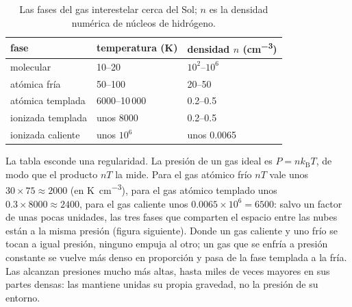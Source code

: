 \begin{table}[htbp]
\centering
\small
\begin{tabular}{lll}
\hline
fase & temperatura (K) & densidad $n$ (\unit{cm^{-3}}) \\
\hline
molecular & 10--20 & $10^2$--$10^6$ \\
atómica fría & 50--100 & 20--50 \\
atómica templada & 6000--10\,000 & 0.2--0.5 \\
ionizada templada & unos 8000 & 0.2--0.5 \\
ionizada caliente & unos $10^6$ & unos 0.0065 \\
\hline
\end{tabular}
\caption{Las fases del gas interestelar cerca del Sol; $n$ es la densidad
numérica de núcleos de hidrógeno.}
\label{tab:b2:ism-star-formation:phases}
\end{table}

La tabla esconde una regularidad. La presión de un gas ideal es
$P = n k_{\mathrm B} T$, de modo que el producto $nT$ la mide. Para el gas atómico frío
$nT$ vale unos $30\times75 \approx 2000$ (en \unit{K.cm^{-3}}), para el gas atómico
templado unos $0.3\times8000 \approx 2400$, para el gas caliente unos
$0.0065\times10^6 = 6500$: salvo un factor de unas pocas unidades, las tres fases que
comparten el espacio entre las nubes están a la misma presión (figura siguiente).
Donde un gas caliente y uno frío se tocan a igual presión, ninguno empuja al otro;
un gas que se enfría a presión constante se vuelve más denso en proporción y
pasa de la fase templada a la fría. Las  alcanzan presiones mucho más altas, hasta miles de veces mayores en sus partes densas: las mantiene unidas su propia gravedad, no la
presión de su entorno.

